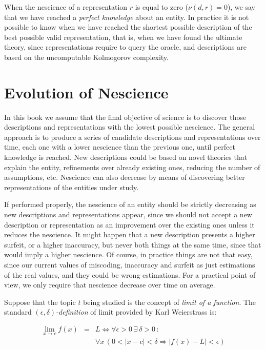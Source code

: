 When the nescience of a representation $r$ is equal to zero ($\nu(d, r)=0$), we say that we have reached a \emph{perfect knowledge} about an entity. In practice it is not possible to know when we have reached the shortest possible description of the best possible valid representation, that is, when we have found the ultimate theory, since representations require to query the oracle, and descriptions are based on the uncomputable Kolmogorov complexity.

%
%

\section{Evolution of Nescience}

In this book we assume that the final objective of science is to discover those descriptions and representations with the lowest possible nescience. The general approach is to produce a series of candidate descriptions and representations over time, each one with a lower nescience than the previous one, until perfect knowledge is reached. New descriptions could be based on novel theories that explain the entity, refinements over already existing ones, reducing the number of assumptions, etc. Nescience can also decrease by means of discovering better representations of the entities under study.

If performed properly, the nescience of an entity should be strictly decreasing as new descriptions and representations appear, since we should not accept a new description or representation as an improvement over the existing ones unless it reduces the nescience. It might happen that a new description presents a higher surfeit, or a higher inaccuracy, but never both things at the same time, since that would imply a higher nescience. Of course, in practice things are not that easy, since our current values of miscoding, inaccuracy and surfeit as just estimations of the real values, and they could be wrong estimations. For a practical point of view, we only require that nescience decrease over time on average.

Suppose that the topic $t$ being studied is the concept of \emph{limit of a function}. The standard \emph{$\left(\epsilon,\delta\right)$-definition} of limit provided by Karl Weierstrass is:

\begin{eqnarray*}
\lim_{x\rightarrow c}f(x) & = & L\Leftrightarrow\forall\epsilon>0\:\exists\,\delta>0\,:\,\\
 &  & \forall x\,\left(0<\left|x-c\right|<\delta\Rightarrow\left|f(x)-L\right|<\epsilon\right)
\end{eqnarray*}


